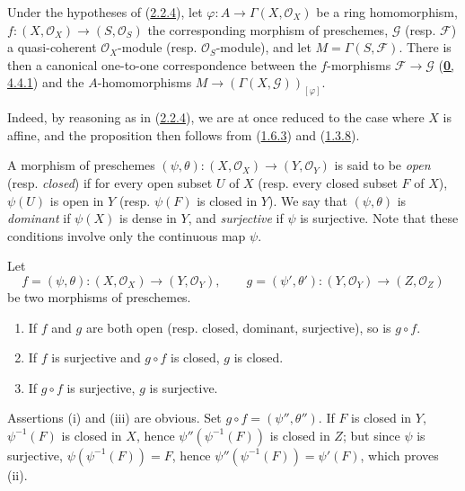 \begin{proposition}[2.2.5]
\label{I.2.2.5}
Under the hypotheses of \textup{(\hyperref[I.2.2.4]{2.2.4})}, let
$\varphi:A\to\Gamma(X,\mathscr{O}_X)$ be a ring homomorphism,
$f:(X,\mathscr{O}_X)\to(S,\mathscr{O}_S)$ the corresponding morphism of
preschemes, $\mathscr{G}$ \textup{(resp. $\mathscr{F}$)} a quasi-coherent
$\mathscr{O}_X$-module \textup{(resp.} $\mathscr{O}_S$-module), and
let $M=\Gamma(S,\mathscr{F})$. There is then a
canonical one-to-one correspondence between the $f$-morphisms
$\mathscr{F}\to\mathscr{G}$ \textup{(\hyperref[0.4.4.1]{\textbf{0}, 4.4.1})} and the
$A$-homomorphisms
$M\to(\Gamma(X,\mathscr{G}))_{[\varphi]}$.
\end{proposition}

Indeed, by reasoning as in (\hyperref[I.2.2.4]{2.2.4}), we are at once
reduced to the case where $X$ is affine, and the proposition then follows
from (\hyperref[I.1.6.3]{1.6.3}) and (\hyperref[I.1.3.8]{1.3.8}).

\begin{env}[2.2.6]
\label{I.2.2.6}
A morphism of preschemes
$(\psi,\theta):(X,\mathscr{O}_X)\to(Y,\mathscr{O}_Y)$ is said to be
\emph{open} (resp. \emph{closed}) if for every open subset $U$ of $X$ (resp.
every closed subset $F$ of $X$), $\psi(U)$ is open in $Y$ (resp. $\psi(F)$
is closed in $Y$). We say that $(\psi,\theta)$ is \emph{dominant} if
$\psi(X)$ is dense in $Y$, and \emph{surjective} if $\psi$ is surjective.
Note that these conditions involve only the continuous map $\psi$.
\end{env}

\begin{proposition}[2.2.7]
\label{I.2.2.7}
Let
\[
  f=(\psi,\theta):(X,\mathscr{O}_X)\to(Y,\mathscr{O}_Y),
  \qquad
  g=(\psi',\theta'):(Y,\mathscr{O}_Y)\to(Z,\mathscr{O}_Z)
\]
be two morphisms of preschemes.
\begin{enumerate}
  \item[\rm(i)] If $f$ and $g$ are both open \textup{(resp.} closed, dominant,
    surjective), so is $g\circ f$.
  \item[\rm(ii)] If $f$ is surjective and $g\circ f$ is closed, $g$ is
    closed.
  \item[\rm(iii)] If $g\circ f$ is surjective, $g$ is surjective.
\end{enumerate}
\end{proposition}

Assertions (i) and (iii) are obvious. Set
$g\circ f=(\psi'',\theta'')$. If $F$ is closed in $Y$,
$\psi^{-1}(F)$ is closed in $X$, hence
$\psi''(\psi^{-1}(F))$ is closed in $Z$; but since $\psi$ is surjective,
$\psi(\psi^{-1}(F))=F$, hence
$\psi''(\psi^{-1}(F))=\psi'(F)$, which proves (ii).

